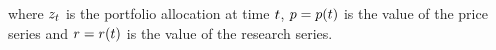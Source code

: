 \documentclass{article}
\begin{document}
\hspace{200mm}

\noindent where $z_t$ is the portfolio allocation at time $t$, $p = p(t)$ is the value of the price series and $r = r(t)$ is the value of the research series.

\hspace{200mm}
\hspace{200mm}

\keyterms

\furtherlinks
\end{document}

